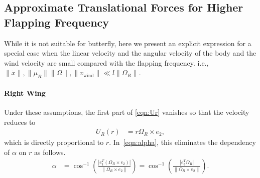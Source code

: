 \documentclass[conf]{new-aiaa}
\begin{document}
\subsection{Approximate Translational Forces for Higher Flapping Frequency}

While it is not suitable for butterfly, here we present an explicit expression for a special case when the linear velocity and the angular velocity of the body and the wind velocity are small compared with the flapping frequency. i.e., $\|\dot x\|, \|\mu_R\|\|\Omega\|, \|v_{\mathrm{wind}}\| \ll l\|\Omega_R\|$.  

\paragraph{Right Wing}

Under these assumptions, the first part of \eqref{eqn:Ur} vanishes so that the velocity reduces to 
\begin{align*}
    U_R(r) & = r \Omega_R \times e_2,
\end{align*}
which is directly proportional to $r$. 
In~\eqref{eqn:alpha}, this eliminates the dependency of $\alpha$  on $r$ as follows.
\begin{align*}
    \alpha & = \cos^{-1} (\frac{ |e_1^T (\Omega_R \times e_2)|}{\|\Omega_R\times e_2\|}) = \cos^{-1} (\frac{ |e_3^T \Omega_R |}{\|\Omega_R \times e_2\|} ).
\end{align*}
\end{document}
